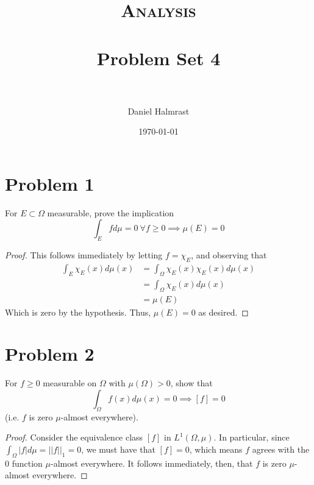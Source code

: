 \documentclass[fontsize=11pt]{scrartcl} %
\title{	
\normalfont \normalsize 
\textsc{Analysis} \\ [25pt] %
\horrule{0.5pt} \\[0.4cm] %
\huge Problem Set 4\\ %
\horrule{2pt} \\[0.5cm] %
}
\author{Daniel Halmrast} %
\date{\normalsize\today} %
\numberwithin{equation}{section} %
\numberwithin{figure}{section} %
\numberwithin{table}{section} %
\begin{document}
\maketitle %

\section*{Problem 1}
For $E\subset\Omega$ measurable, prove the implication
\[
\int_E fd\mu = 0\ \forall f\geq 0 \implies \mu(E) = 0
\]

\begin{proof}
This follows immediately by letting $f = \chi_E$, and observing that
\[
\begin{aligned}
\int_E \chi_E(x)d\mu(x) &=\int_{\Omega}\chi_E(x)\chi_E(x)d\mu(x)\\
                        &=\int_{\Omega}\chi_E(x)d\mu(x)\\
                        &=\mu(E)
\end{aligned}
\]
Which is zero by the hypothesis. Thus, $\mu(E) = 0$ as desired.
\end{proof}
\pagebreak
\section*{Problem 2}
For $f\geq 0$ measurable on $\Omega$ with $\mu(\Omega) > 0$, show that
\[
\int_{\Omega}f(x)d\mu(x) = 0 \implies [f] = 0
\]
(i.e. $f$ is zero $\mu$-almost everywhere).
\\
\begin{proof}
Consider the equivalence class $[f]$ in $L^1(\Omega,\mu)$. In particular,
since $\int_{\Omega}|f|d\mu =||f||_1 = 0$, we must have that $[f]=0$, which means
$f$ agrees with the $0$ function $\mu$-almost everywhere. It follows immediately, then,
that $f$ is zero $\mu$-almost everywhere.
\end{proof}
\end{document}
